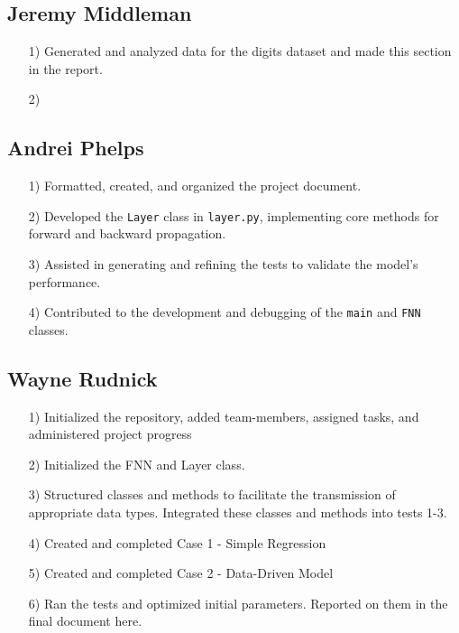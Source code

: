 \documentclass{article}
\begin{document}
\subsection{Jeremy Middleman}
\begin{itemize}
    \item[1)] Generated and analyzed data for the digits dataset and made this section in the report.
    \item[2)] 
\end{itemize}

\subsection{Andrei Phelps}
\begin{itemize}
    \item[1)] Formatted, created, and organized the project document.
    \item[2)] Developed the \texttt{Layer} class in \texttt{layer.py}, implementing core methods for forward and backward propagation.
    \item[3)] Assisted in generating and refining the tests to validate the model's performance.
    \item[4)] Contributed to the development and debugging of the \texttt{main} and \texttt{FNN} classes.
\end{itemize}

\subsection{Wayne Rudnick}
\begin{itemize}
    \item[1)] Initialized the repository, added team-members, assigned tasks, and administered project progress
    \item[2)] Initialized the FNN and Layer class.
    \item[3)] Structured classes and methods to facilitate the transmission of appropriate data types. Integrated these classes and methods into tests 1-3.
    \item[4)] Created and completed Case 1 - Simple Regression
    \item[5)] Created and completed Case 2 - Data-Driven Model
    \item[6)] Ran the tests and optimized initial parameters. Reported on them in the final document here.
\end{itemize}
\end{document}
